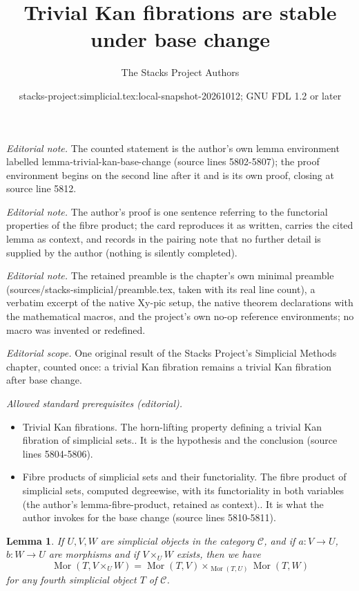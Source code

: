\documentclass{stacks-project}
\title{Trivial Kan fibrations are stable under base change}
\author{The Stacks Project Authors}
\date{stacks-project:simplicial.tex:local-snapshot-20261012; GNU FDL 1.2 or later}
\theoremstyle{plain}
\newtheorem{lemma}[subsection]{Lemma}
\theoremstyle{definition}
\theoremstyle{remark}
\numberwithin{equation}{subsection}
\def\Mor{\mathop{\mathrm{Mor}}\nolimits}
\begin{document}
\maketitle
\noindent\textit{Editorial note.} The counted statement is the author's own lemma environment labelled lemma-trivial-kan-base-change (source lines 5802-5807); the proof environment begins on the second line after it and is its own proof, closing at source line 5812.\par\medskip
\noindent\textit{Editorial note.} The author's proof is one sentence referring to the functorial properties of the fibre product; the card reproduces it as written, carries the cited lemma as context, and records in the pairing note that no further detail is supplied by the author (nothing is silently completed).\par\medskip
\noindent\textit{Editorial note.} The retained preamble is the chapter's own minimal preamble (sources/stacks-simplicial/preamble.tex, taken with its real line count), a verbatim excerpt of the native Xy-pic setup, the native theorem declarations with the mathematical macros, and the project's own no-op reference environments; no macro was invented or redefined.\par\medskip
\noindent\textit{Editorial scope.} One original result of the Stacks Project's Simplicial Methods chapter, counted once: a trivial Kan fibration remains a trivial Kan fibration after base change.\par\medskip
\noindent\textit{Allowed standard prerequisites (editorial).}\begin{itemize}
\item Trivial Kan fibrations. The horn-lifting property defining a trivial Kan fibration of simplicial sets.. It is the hypothesis and the conclusion (source lines 5804-5806).
\item Fibre products of simplicial sets and their functoriality. The fibre product of simplicial sets, computed degreewise, with its functoriality in both variables (the author's lemma-fibre-product, retained as context).. It is what the author invokes for the base change (source lines 5810-5811).
\end{itemize}\medskip
\begin{lemma}
\label{lemma-fibre-product}
If $U, V, W$ are simplicial objects in the category $\mathcal{C}$,
and if $a : V \to U$, $b : W \to U$ are morphisms
and if $V \times_U W$ exists, then we have
$$
\Mor(T, V \times_U W) =
\Mor(T, V) \times_{\Mor(T, U)}
\Mor(T, W)
$$
for any fourth simplicial object $T$ of $\mathcal{C}$.
\end{lemma}
\end{document}
